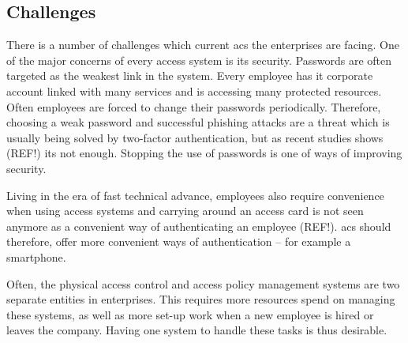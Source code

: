\subsection{Challenges} \label{challenges}

There is a number of challenges which current \acrshort{acs} the enterprises are facing. One of the major concerns of every access system is its security. Passwords are often targeted as the weakest link in the system. Every employee has it corporate account linked with many services and is accessing many protected resources. Often employees are forced to change their passwords periodically. Therefore, choosing a weak password and successful phishing attacks are a threat which is usually being solved by two-factor authentication, but as recent studies shows
(REF!) its not enough. Stopping the use of passwords is one of ways of improving security.

Living in the era of fast technical advance, employees also require convenience when using access systems and carrying around an access card is not seen anymore as a convenient way of authenticating an employee 
(REF!). \acrshort{acs} should therefore, offer more convenient ways of authentication -- for example a smartphone.

Often, the physical access control and access policy management systems are two separate entities in enterprises. This requires more resources spend on managing these systems, as well as more set-up work when a new employee is hired or leaves the company. Having one system to handle these tasks is thus desirable.

